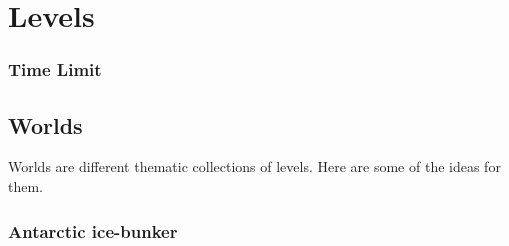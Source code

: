 \documentclass[../Main.tex]{subfiles}
\begin{document}
\section{Levels}

\subsubsection{Time Limit}

\subsection{Worlds}

Worlds are different thematic collections of levels. Here are some of the ideas for them.

\subsubsection{Antarctic ice-bunker}
\end{document}
